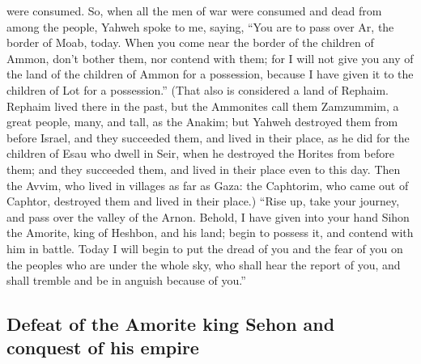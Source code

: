 were consumed.  So, when all the men of war were consumed
and dead from among the people,  Yahweh spoke to me,
saying,  ``You are to pass over Ar, the border of Moab,
today.  When you come near the border of the children of
Ammon, don't bother them, nor contend with them; for I will not give you
any of the land of the children of Ammon for a possession, because I
have given it to the children of Lot for a possession.'' 
(That also is considered a land of Rephaim. Rephaim lived there in the
past, but the Ammonites call them Zamzummim,  a great
people, many, and tall, as the Anakim; but Yahweh destroyed them from
before Israel, and they succeeded them, and lived in their place,
 as he did for the children of Esau who dwell in Seir,
when he destroyed the Horites from before them; and they succeeded them,
and lived in their place even to this day.  Then the
Avvim, who lived in villages as far as Gaza: the Caphtorim, who came out
of Caphtor, destroyed them and lived in their place.) 
``Rise up, take your journey, and pass over the valley of the Arnon.
Behold, I have given into your hand Sihon the Amorite, king of Heshbon,
and his land; begin to possess it, and contend with him in battle.
 Today I will begin to put the dread of you and the fear
of you on the peoples who are under the whole sky, who shall hear the
report of you, and shall tremble and be in anguish because of you.''

\hypertarget{defeat-of-the-amorite-king-sehon-and-conquest-of-his-empire}{%
\subsection{Defeat of the Amorite king Sehon and conquest of his
empire}\label{defeat-of-the-amorite-king-sehon-and-conquest-of-his-empire}}

